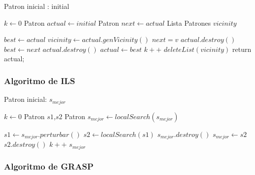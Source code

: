 \documentclass[letterpaper,11pt]{article}
\begin{document}
\begin{algorithmic}

\REQUIRE Patron inicial : initial

\STATE $k \gets 0$
\STATE  Patron $actual \gets initial$
\STATE  Patron $next \gets actual$
\STATE  Lista Patrones $vicinity$

	
	\STATE $ best \gets actual $
	\STATE $ vicinity \gets actual.genVicinity() $
		\STATE $next = v$
        	\STATE $actual.destroy() $
        	\STATE $ best \gets next$
        \ENDIF
    \ENDWHILE
       	\STATE $actual.destroy() $
       	\STATE $ actual \gets best$
	\ENDIF
    \STATE $k++$
    \STATE $deleteList(vicinity)$
\ENDWHILE
\RETURN  return actual;

\end{algorithmic}

\subsubsection{Algoritmo de ILS}

\begin{center}
\begin{algorithmic}

\REQUIRE Patron inicial: $s_{mejor}$

\STATE $k \gets 0$
\STATE Patron $s1$,$s2$
\STATE Patron $s_{mejor} \gets localSearch(s_{mejor})$

    \STATE $ s1 \gets s_{mejor}.perturbar() $
    \STATE $ s2 \gets localSearch(s1) $
    	\STATE $ s_{mejor}.destroy() $
        \STATE $ s_{mejor} \gets s2 $
    \ENDIF
    \STATE $ s2.destroy() $
    \STATE $k++$
\ENDWHILE
\RETURN $s_{mejor}$

\end{algorithmic}
\end{center}

\subsubsection{Algoritmo de GRASP}
\end{document}
